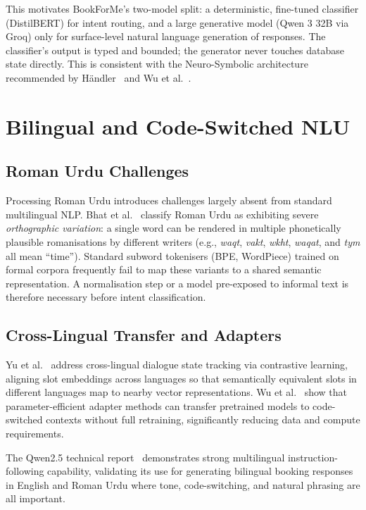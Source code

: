 This motivates BookForMe's two-model split: a deterministic, fine-tuned
classifier (DistilBERT) for intent routing, and a large generative model
(Qwen 3 32B via Groq) only for surface-level natural language generation of
responses. The classifier's output is typed and bounded; the generator never
touches database state directly. This is consistent with the Neuro-Symbolic
architecture recommended by H{\"a}ndler~\cite{handler2023} and Wu et
al.~\cite{wu2023autogen}.

\section{Bilingual and Code-Switched NLU}
\label{sec:lit-bilingual}

\subsection{Roman Urdu Challenges}

Processing Roman Urdu introduces challenges largely absent from standard
multilingual NLP. Bhat et al.~\cite{bhat2023} classify Roman Urdu as
exhibiting severe \textit{orthographic variation}: a single word can be
rendered in multiple phonetically plausible romanisations by different writers
(e.g., \textit{waqt}, \textit{vakt}, \textit{wkht}, \textit{waqat}, and
\textit{tym} all mean ``time''). Standard subword tokenisers (BPE, WordPiece)
trained on formal corpora frequently fail to map these variants to a shared
semantic representation. A normalisation step or a model pre-exposed to
informal text is therefore necessary before intent classification.

\subsection{Cross-Lingual Transfer and Adapters}

Yu et al.~\cite{yu2023} address cross-lingual dialogue state tracking via
contrastive learning, aligning slot embeddings across languages so that
semantically equivalent slots in different languages map to nearby vector
representations. Wu et al.~\cite{wu2023adapter} show that parameter-efficient
adapter methods can transfer pretrained models to code-switched contexts
without full retraining, significantly reducing data and compute requirements.

The Qwen2.5 technical report~\cite{qwen2025} demonstrates strong multilingual
instruction-following capability, validating its use for generating bilingual
booking responses in English and Roman Urdu where tone, code-switching, and
natural phrasing are all important.

